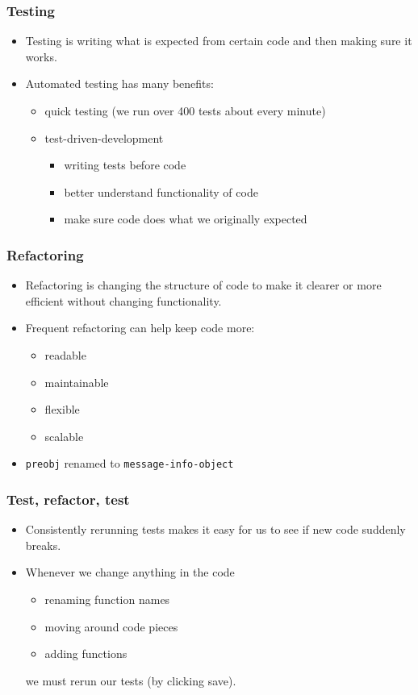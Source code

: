 \documentclass{beamer}
\begin{document}
\begin{frame}[fragile]
\frametitle{Testing}

\begin{itemize}
\item Testing is writing what is expected from certain code and then making sure it works.
\item Automated testing has many benefits:
\begin{itemize}
\item quick testing (we run over 400 tests about every minute)
\item test-driven-development
\begin{itemize}
\item writing tests before code
\item better understand functionality of code
\item make sure code does what we originally expected
\end{itemize}
\end{itemize}
\end{itemize}	
\end{frame}

\begin{frame}[fragile]
\frametitle{Refactoring}
\begin{itemize}
\item Refactoring is changing the structure of code to make it clearer or more efficient  without changing functionality.
\item Frequent refactoring can help keep code more: 
\begin{itemize}
\item readable
\item maintainable
\item flexible
\item scalable
\end{itemize}
\item {\tt preobj} renamed to {\tt message-info-object}
\end{itemize}	
\end{frame}

\begin{frame}[fragile]
\frametitle{Test, refactor, test}
\begin{itemize}
\item Consistently rerunning tests makes it easy for us to see if new code suddenly breaks.
\item Whenever we change anything in the code
\begin{itemize}
\item renaming function names
\item moving around code pieces
\item adding functions
\end{itemize}
we must rerun our tests (by clicking save).
\end{itemize}		
\end{frame}
\end{document}

